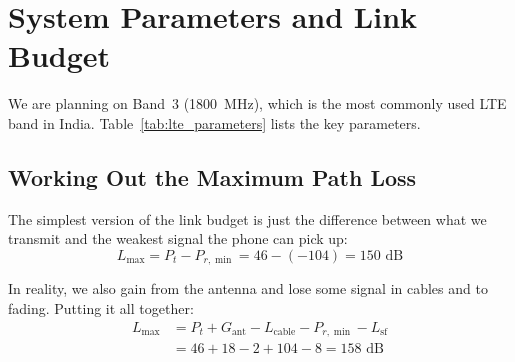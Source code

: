 \documentclass[10pt,a4paper,twocolumn]{article}
\begin{document}
\section{System Parameters and Link Budget}
\label{sec:link_budget}

We are planning on Band~3 (1800~MHz), which is the most commonly used LTE band in India. Table~\ref{tab:lte_parameters} lists the key parameters.

\begin{table}[H]
\centering
\caption{4G LTE System Parameters}
\label{tab:lte_parameters}
%
\end{table}

\subsection{Working Out the Maximum Path Loss}

The simplest version of the link budget is just the difference between what we transmit and the weakest signal the phone can pick up:
\begin{equation}
L_{\max} = P_{t} - P_{r,\min} = 46 - (-104) = 150 \text{ dB}
\end{equation}

In reality, we also gain from the antenna and lose some signal in cables and to fading. Putting it all together:
\begin{align}
L_{\max} &= P_t + G_{\text{ant}} - L_{\text{cable}} - P_{r,\min} - L_{\text{sf}} \nonumber \\
&= 46 + 18 - 2 + 104 - 8 = \boxed{158 \text{ dB}}
\end{align}
\end{document}
